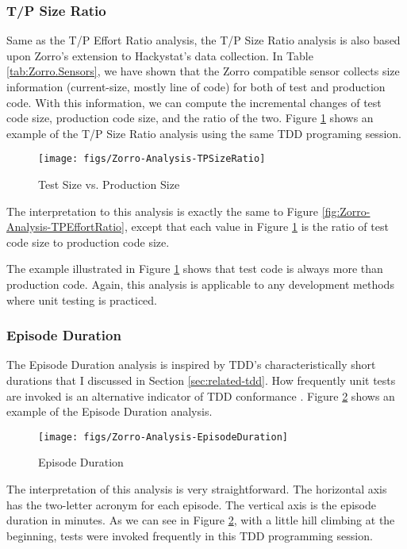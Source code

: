 \subsubsection{T/P Size Ratio}
Same as the T/P Effort Ratio analysis, the T/P Size Ratio analysis is also
based upon Zorro's extension to Hackystat's data collection. In Table 
\ref{tab:Zorro.Sensors}, we have shown that the Zorro compatible sensor 
collects size information (current-size, mostly line of code) for both
of test and production code. With this information, we can compute the
incremental changes of test code size, production code size, and the 
ratio of the two. Figure \ref{fig:Zorro-Analysis-TPSizeRatio} shows 
an example of the T/P Size Ratio analysis using the same TDD programing 
session. 
\begin{figure}[htbp]
  \centering
  \texttt{[image: figs/Zorro-Analysis-TPSizeRatio]}
  \caption{Test Size vs. Production Size}
  \label{fig:Zorro-Analysis-TPSizeRatio}
\end{figure}
The interpretation to this analysis is exactly the same to Figure
\ref{fig:Zorro-Analysis-TPEffortRatio}, except that each value 
in Figure \ref{fig:Zorro-Analysis-TPSizeRatio} is the ratio of 
test code size to production code size. 

The example illustrated in Figure \ref{fig:Zorro-Analysis-TPSizeRatio}
shows that test code is always more than production code. Again, this
analysis is applicable to any development methods where unit testing 
is practiced. 

\subsubsection{Episode Duration}
The Episode Duration analysis is inspired by TDD's characteristically 
short durations that I discussed in Section \ref{sec:related-tdd}. How
frequently unit tests are invoked is an alternative indicator of 
TDD conformance \cite{Wang:04}. Figure \ref{fig:Zorro-Analysis-EpisodeDuration}
shows an example of the Episode Duration analysis. 
\begin{figure}[htbp]
  \centering
  \texttt{[image: figs/Zorro-Analysis-EpisodeDuration]}
  \caption{Episode Duration}
  \label{fig:Zorro-Analysis-EpisodeDuration}
\end{figure}
The interpretation of this analysis is very straightforward. The 
horizontal axis has the two-letter acronym for each episode. 
The vertical axis is the episode duration in minutes. As we 
can see in Figure \ref{fig:Zorro-Analysis-EpisodeDuration},
with a little hill climbing at the beginning, tests were invoked 
frequently in this TDD programming session. 

